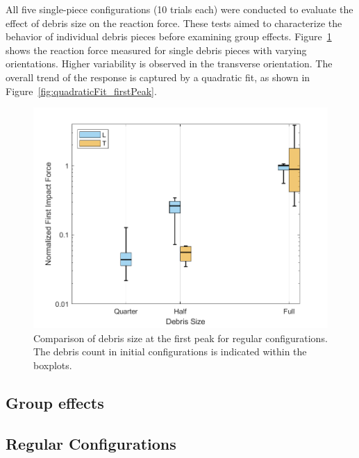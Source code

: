 \documentclass{article}
\begin{document}
{All five single-piece configurations (10 trials each) were conducted to evaluate the effect of debris size on the reaction force. These tests aimed to characterize the behavior of individual debris pieces before examining group effects. Figure~\ref{fig:firstpeak_regular} shows the reaction force measured for single debris pieces with varying orientations. Higher variability is observed in the transverse orientation. The overall trend of the response is captured by a quadratic fit, as shown in Figure~\ref{fig:quadraticFit_firstPeak}.

\begin{figure}[htbp]
    \centering
    \includegraphics[width=\textwidth]{FirstPeak_Regular_SplitByTrial_single.png}
    \caption{Comparison of debris size at the first peak for regular configurations. The debris count in initial configurations is indicated within the boxplots.}
    \label{fig:firstpeak_regular}
\end{figure}


\subsection{Group effects}
\subsection{Regular Configurations}
}
\end{document}
